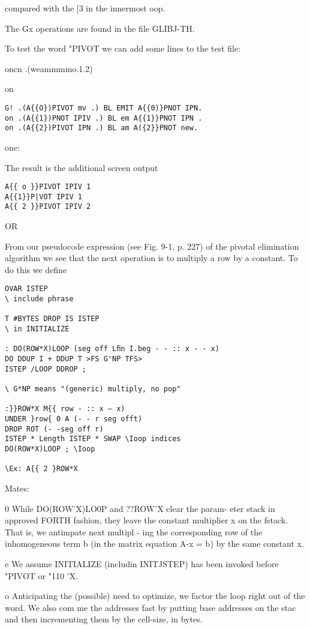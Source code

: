 {{{{{{{{{compared with the [3 in the innermost oop.

The Gx operations are found in the ﬁle GLIBJ-TH.

To test the word "PIVOT we can add some lines to the test file:

oncn .(weammmmo.1.2)

on

\begin{verbatim}
G! .(A{{O})PIVOT mv .) BL EMIT A{{0)}PNOT IPN.
on .(A{{1})PNOT IPIV .) BL em A{{1}}PNOT IPN .
on .(A{{2})PIVOT IPN .) BL am A({2}}PNOT new.
\end{verbatim}
one:


The result is the additional screen output

\begin{verbatim}
A{{ o }}PIVOT IPIV 1
A{{1}}P|VOT IPIV 1
A{{ 2 }}PIVOT IPIV 2
\end{verbatim}
OR

From our pseudocode expression (see Fig. 9-1, p. 227) of the
pivotal elimination algorithm we see that the next operation is to
multiply a row by a constant. To do this we deﬁne

\begin{verbatim}
OVAR ISTEP
\ include phrase

T #BYTES DROP IS ISTEP
\ in INITIALIZE

: DO(ROW*X)LOOP (seg off Lﬁn I.beg - - :: x - - x)
DO DDUP I + DDUP T >FS G'NP TFS>
ISTEP /LOOP DDROP ;

\ G*NP means "(generic) multiply, no pop"

:}}ROW*X M{{ row - :: x — x)
UNDER }row{ 0 A (- - r seg offt)
DROP ROT (- -seg off r)
ISTEP * Length ISTEP * SWAP \Ioop indices
DO(ROW*X)LOOP ; \Ioop

\Ex: A{{ 2 }ROW*X

\end{verbatim}
Mates:

0 While DO(ROW'X)LO0P and ??ROW'X clear the param-
eter stack in approved FORTH fashion, they leave the constant
multiplier x on the fstack. That is, we antimpate next multipl -
ing the corresponding row of the inhomogeneous term b (in
the matrix equation A-x = b) by the same constant x.

e We assume INITIALIZE (includin INITJSTEP) has been
invoked before "PIVOT or "110 'X.

o Anticipating the (possible) need to optimize, we factor the loop
right out of the word. We also com me the addresses fast by
putting base addresses on the stac and then incrementing
them by the cell-size, in bytes.

}}}}}}}}}
